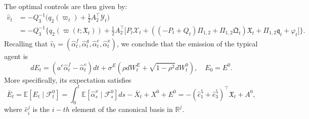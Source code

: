 \documentclass[11pt,twoside]{amsart}
\theoremstyle{definition}
\numberwithin{equation}{section}
\newcommand{\E}{\mathbb{E}}
\newcommand{\R}{\mathbb{R}}
\newcommand{\ItF}{\mathcal{F}}
\renewcommand{\bar}{\overline}
\renewcommand{\hat}{\widehat}
\begin{document}
The optimal controls are then given by:
\begin{align*}
    \hat{v}_t &= -Q_3^{-1} \bigg( q_2(\varpi_t) + \frac{1}{2} A_2^\top \mathcal{Y}_t \bigg)\\
    &= -Q_3^{-1} \bigg\{ q_2(\varpi(t; \mathfrak{X}_t)) + \frac{1}{2} A_2^\top \big[P_t \mathcal{X}_t+ ((-P_t+Q_t)\Pi_{1,2} + \Pi_{1,2}\mathfrak{Q}_t)\mathfrak{X}_t + \Pi_{1,2}\mathfrak{q}_t + \varphi_t\big] \bigg\}.
\end{align*}
Recalling that $\hat{v}_t = (\hat\alpha^f_t, \hat\alpha^g_t, \hat\alpha^e_t, \hat\alpha^x_t)$, we conclude that the emission of the typical agent is
\begin{equation*}
dE_t = (a^e \hat\alpha^{f}_t - \hat\alpha^{e}_t) dt + \sigma^E(\rho dW^{E}_t + \sqrt{1- \rho^2} dW^0_t), \quad E_0 = E^0.
\end{equation*}
More specifically, its expectation satisfies
\begin{equation*}
    \bar{E}_t = \E[E_t \mid \ItF^0_t] = \int_0^t\E[ \hat{\alpha}^{x}_s \mid \ItF^0_s] ds - \bar{X}_t + X^0+ E^0 = -(\hat{e}^5_1 + \hat{e}^5_3)^\top \mathfrak{X}_t + A^0,
\end{equation*}
where $\hat{e}^{j}_i$ is the $i-th$ element of the canonical basis in $\R^j$.

\newpage





\end{document}
